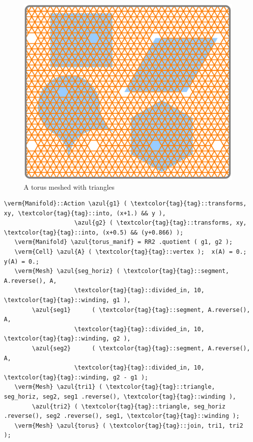 \begin{figure}[ht] \centering
  \includegraphics[width=120mm]{flat-torus-5.eps}
  \caption{A torus meshed with triangles}
  \label{\numb section 7.\numb fig 6}
\end{figure}

\begin{Verbatim}[commandchars=\\\{\},formatcom=\small\tt,frame=single,
   label=parag-\ref{\numb section 7.\numb parag 9}.cpp,rulecolor=\color{coment},
   baselinestretch=0.94,framesep=2mm                                            ]
   \verm{Manifold}::Action \azul{g1} ( \textcolor{tag}{tag}::transforms, xy, \textcolor{tag}{tag}::into, (x+1.) && y ),
                    \azul{g2} ( \textcolor{tag}{tag}::transforms, xy, \textcolor{tag}{tag}::into, (x+0.5) && (y+0.866) );
   \verm{Manifold} \azul{torus_manif} = RR2 .quotient ( g1, g2 );
   \verm{Cell} \azul{A} ( \textcolor{tag}{tag}::vertex );  x(A) = 0.;  y(A) = 0.;
   \verm{Mesh} \azul{seg_horiz} ( \textcolor{tag}{tag}::segment, A.reverse(), A,
                    \textcolor{tag}{tag}::divided_in, 10, \textcolor{tag}{tag}::winding, g1 ),
        \azul{seg1}      ( \textcolor{tag}{tag}::segment, A.reverse(), A,
                    \textcolor{tag}{tag}::divided_in, 10, \textcolor{tag}{tag}::winding, g2 ),
        \azul{seg2}      ( \textcolor{tag}{tag}::segment, A.reverse(), A,
                    \textcolor{tag}{tag}::divided_in, 10, \textcolor{tag}{tag}::winding, g2 - g1 );
   \verm{Mesh} \azul{tri1} ( \textcolor{tag}{tag}::triangle, seg_horiz, seg2, seg1 .reverse(), \textcolor{tag}{tag}::winding ),
        \azul{tri2} ( \textcolor{tag}{tag}::triangle, seg_horiz .reverse(), seg2 .reverse(), seg1, \textcolor{tag}{tag}::winding );
   \verm{Mesh} \azul{torus} ( \textcolor{tag}{tag}::join, tri1, tri2 );
\end{Verbatim}

